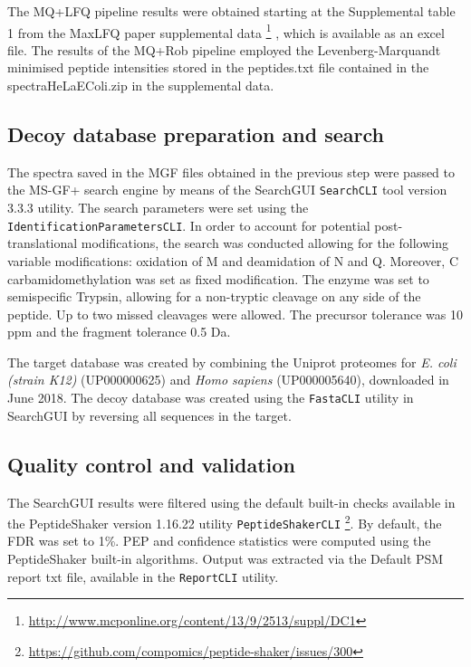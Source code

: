 The MQ+LFQ pipeline results were obtained starting at the Supplemental table 1 from the MaxLFQ paper supplemental data \footnote{\href{http://www.mcponline.org/content/13/9/2513/suppl/DC1}{http://www.mcponline.org/content/13/9/2513/suppl/DC1}} \cite{Cox2014}, which is available as an excel file. The results of the MQ+Rob pipeline employed the Levenberg-Marquandt minimised peptide intensities stored in the peptides.txt file contained in the spectraHeLaEColi.zip in the supplemental data.


\subsection{Decoy database preparation and search}
\label{subsec:database_preparation}

The spectra saved in the MGF files obtained in the previous step were passed to the MS-GF+ search engine \cite{Kim2014} by means of the SearchGUI \texttt{SearchCLI} tool version 3.3.3 \cite{Barsnes2018} utility. The search parameters were set using the \texttt{IdentificationParametersCLI}. In order to account for potential post-translational modifications, the search was conducted allowing for the following variable modifications: oxidation of M and deamidation of N and Q. Moreover, C carbamidomethylation was set as fixed modification. The enzyme was set to semispecific Trypsin, allowing for a non-tryptic cleavage on any side of the peptide. Up to two missed cleavages were allowed. The precursor tolerance was 10 ppm and the fragment tolerance 0.5 Da. 


The target database was created by combining the Uniprot proteomes for \textit{E. coli (strain K12)} (UP000000625) and \textit{Homo sapiens} (UP000005640), downloaded in June 2018. The decoy database was created using the \texttt{FastaCLI} utility in SearchGUI by reversing all sequences in the target.

\subsection{Quality control and validation}

The SearchGUI results were filtered using the default built-in checks available in the PeptideShaker version 1.16.22 utility \texttt{PeptideShakerCLI} \cite{Vaudel2015} \footnote{\href{https://github.com/compomics/peptide-shaker/issues/300}{https://github.com/compomics/peptide-shaker/issues/300}}. By default, the FDR was set to 1\%. PEP and confidence statistics were computed using the PeptideShaker built-in algorithms. Output was extracted via the Default PSM report txt file, available in the \texttt{ReportCLI} utility.


